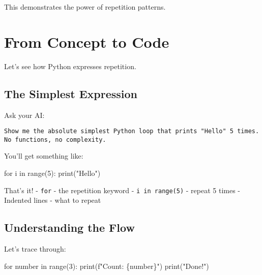 \documentclass[
  letterpaper,
  DIV=11,
  numbers=noendperiod,
  oneside]{scrreprt}
\newenvironment{Shaded}{}{}
\newcommand{\BuiltInTok}[1]{\textcolor[rgb]{0.84,0.23,0.29}{#1}}
\newcommand{\ControlFlowTok}[1]{\textcolor[rgb]{0.84,0.23,0.29}{#1}}
\newcommand{\DecValTok}[1]{\textcolor[rgb]{0.00,0.36,0.77}{#1}}
\newcommand{\KeywordTok}[1]{\textcolor[rgb]{0.84,0.23,0.29}{#1}}
\newcommand{\NormalTok}[1]{\textcolor[rgb]{0.14,0.16,0.18}{#1}}
\newcommand{\SpecialCharTok}[1]{\textcolor[rgb]{0.00,0.36,0.77}{#1}}
\newcommand{\SpecialStringTok}[1]{\textcolor[rgb]{0.01,0.18,0.38}{#1}}
\newcommand{\StringTok}[1]{\textcolor[rgb]{0.01,0.18,0.38}{#1}}
\begin{document}
This demonstrates the power of repetition patterns.

\section{From Concept to Code}\label{from-concept-to-code-4}

Let's see how Python expresses repetition.

\subsection{The Simplest Expression}\label{the-simplest-expression-4}

Ask your AI:

\begin{verbatim}
Show me the absolute simplest Python loop that prints "Hello" 5 times. No functions, no complexity.
\end{verbatim}

You'll get something like:

\begin{Shaded}
\begin{Highlighting}[]
\ControlFlowTok{for}\NormalTok{ i }\KeywordTok{in} \BuiltInTok{range}\NormalTok{(}\DecValTok{5}\NormalTok{):}
    \BuiltInTok{print}\NormalTok{(}\StringTok{"Hello"}\NormalTok{)}
\end{Highlighting}
\end{Shaded}

That's it! - \texttt{for} - the repetition keyword -
\texttt{i\ in\ range(5)} - repeat 5 times - Indented lines - what to
repeat

\subsection{Understanding the Flow}\label{understanding-the-flow-2}

Let's trace through:

\begin{Shaded}
\begin{Highlighting}[]
\ControlFlowTok{for}\NormalTok{ number }\KeywordTok{in} \BuiltInTok{range}\NormalTok{(}\DecValTok{3}\NormalTok{):}
    \BuiltInTok{print}\NormalTok{(}\SpecialStringTok{f"Count: }\SpecialCharTok{\{}\NormalTok{number}\SpecialCharTok{\}}\SpecialStringTok{"}\NormalTok{)}
\BuiltInTok{print}\NormalTok{(}\StringTok{"Done!"}\NormalTok{)}
\end{Highlighting}
\end{Shaded}
\end{document}
